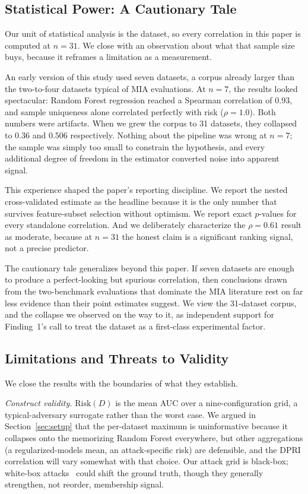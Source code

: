 \subsection{Statistical Power: A Cautionary Tale}
\label{sec:power}

Our unit of statistical analysis is the dataset, so every correlation in
this paper is computed at $n=31$. We close with an observation about what
that sample size buys, because it reframes a limitation as a measurement.

An early version of this study used seven datasets, a corpus already
larger than the two-to-four datasets typical of MIA evaluations. At
$n=7$, the results looked spectacular: Random Forest regression reached a
Spearman correlation of $0.93$, and sample uniqueness alone correlated
perfectly with risk ($\rho = 1.0$). Both numbers were artifacts. When we
grew the corpus to 31 datasets, they collapsed to $0.36$ and $0.506$
respectively. Nothing about the pipeline was wrong at $n=7$; the sample
was simply too small to constrain the hypothesis, and every additional
degree of freedom in the estimator converted noise into apparent signal.

This experience shaped the paper's reporting discipline. We report the
nested cross-validated estimate as the headline because it is the only
number that survives feature-subset selection without optimism. We report
exact $p$-values for every standalone correlation. And we deliberately
characterize the $\rho = 0.61$ result as moderate, because at $n=31$ the
honest claim is a significant ranking signal, not a precise predictor.

The cautionary tale generalizes beyond this paper. If seven datasets are
enough to produce a perfect-looking but spurious correlation, then
conclusions drawn from the two-benchmark evaluations that dominate the
MIA literature rest on far less evidence than their point estimates
suggest. We view the 31-dataset corpus, and the collapse we observed on
the way to it, as independent support for Finding~1's call to treat the
dataset as a first-class experimental factor.

\subsection{Limitations and Threats to Validity}
\label{sec:limitations}

We close the results with the boundaries of what they establish.

\emph{Construct validity.} $\mathrm{Risk}(D)$ is the mean AUC over a
nine-configuration grid, a typical-adversary surrogate rather than the
worst case. We argued in Section~\ref{sec:setup} that the per-dataset
maximum is uninformative because it collapses onto the memorizing
Random Forest everywhere, but other aggregations (a regularized-models
mean, an attack-specific risk) are defensible, and the DPRI correlation
will vary somewhat with that choice. Our attack grid is black-box;
white-box attacks~\cite{nasr2019comprehensive,leino2020stolen} could
shift the ground truth, though they generally strengthen, not reorder,
membership signal.


